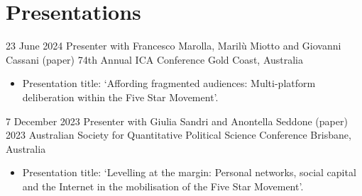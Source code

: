 \documentclass[11pt,a4paper,sans]{moderncv}
\begin{document}















\section{Presentations}

\cventry 
{23 June 2024}
{Presenter with Francesco Marolla, Marilù Miotto and Giovanni Cassani (paper)}
{74th Annual ICA Conference}
{Gold Coast, Australia}
{}
      {
      \begin{itemize} %
        \item {Presentation title: `Affording fragmented audiences: Multi-platform deliberation within the Five Star Movement'.}
      \end{itemize}
    }

\cventry 
{7 December 2023}
{Presenter with Giulia Sandri and Anontella Seddone (paper)}
{2023 Australian Society for Quantitative Political Science Conference}
{Brisbane, Australia}
{}
      {
      \begin{itemize} %
        \item {Presentation title: `Levelling at the margin: Personal networks, social capital and the Internet in the mobilisation of the Five Star Movement'.}
      \end{itemize}
    }
\end{document}
